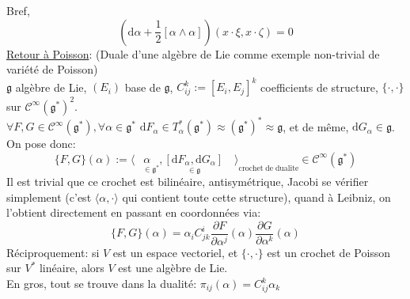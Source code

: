 \documentclass[a4paper,11pt]{article}
\renewcommand{\d}{{\mathrm{d}}}
\newcommand{\dr}[2]{\frac{\partial {#1}}{\partial{#2}}}
\begin{document}
Bref,
$$\boxed{\left(\d\alpha + \frac{1}{2}[\alpha\wedge\alpha]\right)(x\cdot\xi,x\cdot\zeta) = 0}$$
\underline{Retour à Poisson}: (Duale d'une algèbre de Lie comme exemple non-trivial de variété de Poisson)\\
$\mathfrak{g}$ algèbre de Lie, $(E_i)$ base de $\mathfrak{g}$, $C^k_{ij}:=[E_i,E_j]^k$ coefficients de structure, $\{\cdot,\cdot\}$ sur $\mathcal{C}^\infty(\mathfrak{g}^*)^2$.\\
$\forall F,G\in\mathcal{C}^\infty(\mathfrak{g}^*), \forall\alpha\in \mathfrak{g}^*$ \quad 
$\d F_\alpha \in T_\alpha^* (\mathfrak{g}^*) \approx (\mathfrak{g}^*)^* \approx \mathfrak{g}$, et de même, $\d G_\alpha \in \mathfrak{g}$.\\
On pose donc:
$$\{F,G\}(\alpha):=\langle\underset{\quad\in \mathfrak{g}^*}\alpha,\underset{\in\mathfrak{g}}{[\d F_\alpha,\d G_\alpha]}\quad \rangle\!\!\!\underset{\mathrm{crochet}\;\mathrm{de}\;\mathrm{dualite}}\; \in \mathcal{C}^\infty(\mathfrak{g}^*)$$
Il est trivial que ce crochet est bilinéaire, antisymétrique, Jacobi se vérifier simplement (c'est $\langle\alpha,\cdot\rangle$ qui contient toute cette structure), quand à Leibniz, on l'obtient directement en passant en coordonnées via:
$$\{F,G\} (\alpha) = \alpha_i C^i_{jk}\dr F{\alpha^j}(\alpha)\dr G{\alpha^k}(\alpha)$$
Réciproquement: si $V$ est un espace vectoriel, et $\{\cdot,\cdot\}$ est un crochet de Poisson sur $V^*$ linéaire, alors $V$ est une algèbre de Lie.\\
En gros, tout se trouve dans la dualité: $\pi_{ij}(\alpha) = C^k_{ij}\alpha_k$
\end{document}
